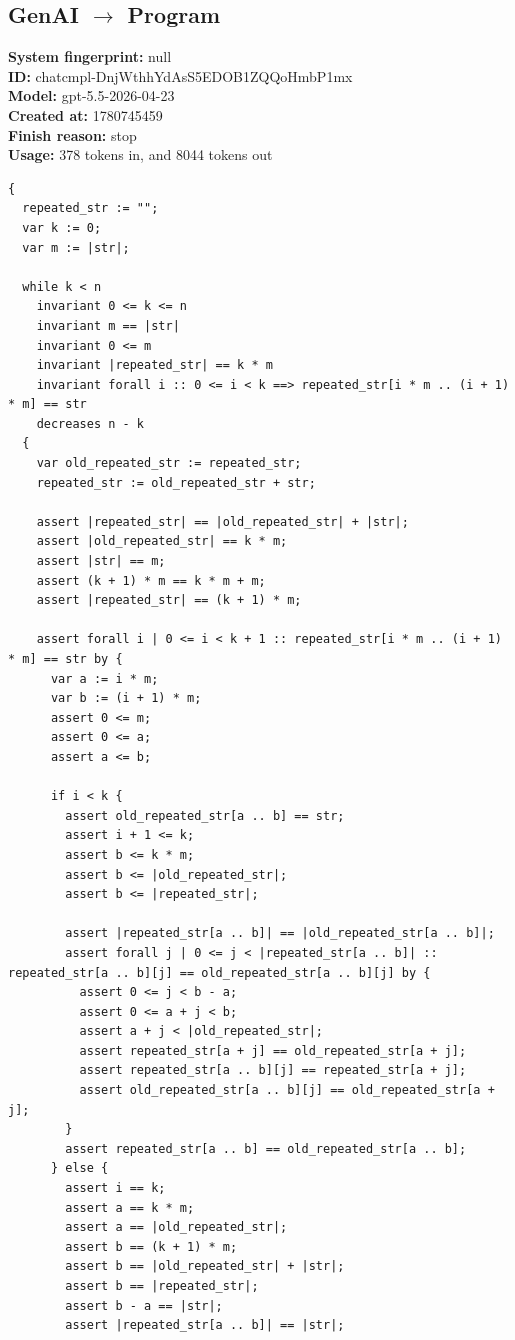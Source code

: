 \documentclass{article}
\begin{document}
\subsection*{GenAI $\rightarrow$ Program}
\textbf{System fingerprint: }null
\\\textbf{ID: }chatcmpl-DnjWthhYdAsS5EDOB1ZQQoHmbP1mx
\\\textbf{Model: }gpt-5.5-2026-04-23
\\\textbf{Created at: }1780745459
\\\textbf{Finish reason: }stop
\\\textbf{Usage: }378 tokens in, and 8044 tokens out
\begin{lstlisting}
{
  repeated_str := "";
  var k := 0;
  var m := |str|;

  while k < n
    invariant 0 <= k <= n
    invariant m == |str|
    invariant 0 <= m
    invariant |repeated_str| == k * m
    invariant forall i :: 0 <= i < k ==> repeated_str[i * m .. (i + 1) * m] == str
    decreases n - k
  {
    var old_repeated_str := repeated_str;
    repeated_str := old_repeated_str + str;

    assert |repeated_str| == |old_repeated_str| + |str|;
    assert |old_repeated_str| == k * m;
    assert |str| == m;
    assert (k + 1) * m == k * m + m;
    assert |repeated_str| == (k + 1) * m;

    assert forall i | 0 <= i < k + 1 :: repeated_str[i * m .. (i + 1) * m] == str by {
      var a := i * m;
      var b := (i + 1) * m;
      assert 0 <= m;
      assert 0 <= a;
      assert a <= b;

      if i < k {
        assert old_repeated_str[a .. b] == str;
        assert i + 1 <= k;
        assert b <= k * m;
        assert b <= |old_repeated_str|;
        assert b <= |repeated_str|;

        assert |repeated_str[a .. b]| == |old_repeated_str[a .. b]|;
        assert forall j | 0 <= j < |repeated_str[a .. b]| :: repeated_str[a .. b][j] == old_repeated_str[a .. b][j] by {
          assert 0 <= j < b - a;
          assert 0 <= a + j < b;
          assert a + j < |old_repeated_str|;
          assert repeated_str[a + j] == old_repeated_str[a + j];
          assert repeated_str[a .. b][j] == repeated_str[a + j];
          assert old_repeated_str[a .. b][j] == old_repeated_str[a + j];
        }
        assert repeated_str[a .. b] == old_repeated_str[a .. b];
      } else {
        assert i == k;
        assert a == k * m;
        assert a == |old_repeated_str|;
        assert b == (k + 1) * m;
        assert b == |old_repeated_str| + |str|;
        assert b == |repeated_str|;
        assert b - a == |str|;
        assert |repeated_str[a .. b]| == |str|;


\end{lstlisting}
\end{document}
